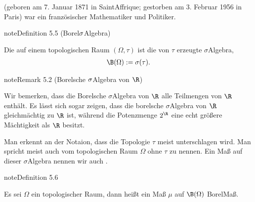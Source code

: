 \documentclass[letterpaper,10pt,german]{jupyterBook}
\begin{document}
\begin{sphinxShadowBox}
\sphinxstylesidebartitle{}

\sphinxAtStartPar
{} (geboren am 7. Januar 1871 in Saint\sphinxhyphen{}Affrique; gestorben am 3. Februar 1956 in Paris) war ein französischer Mathematiker und Politiker.
\end{sphinxShadowBox}
\label{masstheorie/masstheorie:definition-9}
\begin{sphinxadmonition}{note}{Definition 5.5 (Borel\sphinxhyphen{}\protect\(\sigma\protect\)\sphinxhyphen{}Algebra)}



\sphinxAtStartPar
Die  auf einem topologischen Raum \((\Omega, \tau)\) ist die von \(\tau\) erzeugte \(\sigma\)\sphinxhyphen{}Algebra,
\begin{equation*}
\begin{split}\B(\Omega) := \sigma(\tau).\end{split}
\end{equation*}\end{sphinxadmonition}
\label{masstheorie/masstheorie:remark-10}
\begin{sphinxadmonition}{note}{Remark 5.2 (Borelsche \protect\(\sigma\protect\)\sphinxhyphen{}Algebra von \protect\(\R\protect\))}



\sphinxAtStartPar
Wir bemerken, dass die Borelsche \(\sigma\)\sphinxhyphen{}Algebra von \(\R\)  alle Teilmengen von \(\R\) enthält.
Es lässt sich sogar zeigen, dass die borelsche \(\sigma\)\sphinxhyphen{}Algebra von \(\R\) gleichmächtig zu \(\R\) ist, während die Potenzmenge \(2^\R\) eine echt größere Mächtigkeit als \(\R\) besitzt.
\end{sphinxadmonition}

\sphinxAtStartPar
Man erkennt an der Notaion, dass die Topologie \(\tau\) meist unterschlagen wird. Man spricht meist auch vom topologischen Raum \(\Omega\) ohne \(\tau\) zu nennen.
Ein Maß auf dieser \(\sigma\)\sphinxhyphen{}Algebra nennen wir auch .
\label{masstheorie/masstheorie:definition-11}
\begin{sphinxadmonition}{note}{Definition 5.6}



\sphinxAtStartPar
Es sei \(\Omega\) ein topologischer Raum, dann heißt ein Maß \(\mu\) auf \(\B(\Omega)\) Borel\sphinxhyphen{}Maß.
\end{sphinxadmonition}
\end{document}
